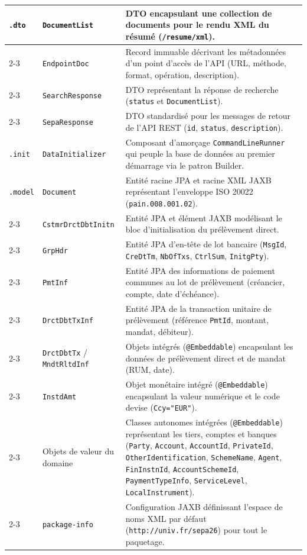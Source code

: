 \documentclass[12pt,a4paper]{article}
\begin{document}
\begin{longtable}{|p{3.8cm}|p{4.6cm}|p{6.8cm}|}
    \texttt{.dto} & \texttt{DocumentList} & DTO encapsulant une collection de documents pour le rendu XML du résumé (\texttt{/resume/xml}). \\
    \cline{2-3}
    & \texttt{EndpointDoc} & Record immuable décrivant les métadonnées d'un point d'accès de l'API (URL, méthode, format, opération, description). \\
    \cline{2-3}
    & \texttt{SearchResponse} & DTO représentant la réponse de recherche (\texttt{status} et \texttt{DocumentList}). \\
    \cline{2-3}
    & \texttt{SepaResponse} & DTO standardisé pour les messages de retour de l'API REST (\texttt{id}, \texttt{status}, \texttt{description}). \\
    \hline

    \texttt{.init} & \texttt{DataInitializer} & Composant d'amorçage \texttt{CommandLineRunner} qui peuple la base de données au premier démarrage via le patron Builder. \\
    \hline

    \texttt{.model} & \texttt{Document} & Entité racine JPA et racine XML JAXB représentant l'enveloppe ISO 20022 (\texttt{pain.008.001.02}). \\
    \cline{2-3}
    & \texttt{CstmrDrctDbtInitn} & Entité JPA et élément JAXB modélisant le bloc d'initialisation du prélèvement direct. \\
    \cline{2-3}
    & \texttt{GrpHdr} & Entité JPA d'en-tête de lot bancaire (\texttt{MsgId}, \texttt{CreDtTm}, \texttt{NbOfTxs}, \texttt{CtrlSum}, \texttt{InitgPty}). \\
    \cline{2-3}
    & \texttt{PmtInf} & Entité JPA des informations de paiement communes au lot de prélèvement (créancier, compte, date d'échéance). \\
    \cline{2-3}
    & \texttt{DrctDbtTxInf} & Entité JPA de la transaction unitaire de prélèvement (référence \texttt{PmtId}, montant, mandat, débiteur). \\
    \cline{2-3}
    & \texttt{DrctDbtTx} / \texttt{MndtRltdInf} & Objets intégrés (\texttt{@Embeddable}) encapsulant les données de prélèvement direct et de mandat (RUM, date). \\
    \cline{2-3}
    & \texttt{InstdAmt} & Objet monétaire intégré (\texttt{@Embeddable}) encapsulant la valeur numérique et le code devise (\texttt{Ccy="EUR"}). \\
    \cline{2-3}
    & Objets de valeur du domaine & Classes autonomes intégrées (\texttt{@Embeddable}) représentant les tiers, comptes et banques (\texttt{Party}, \texttt{Account}, \texttt{AccountId}, \texttt{PrivateId}, \texttt{OtherIdentification}, \texttt{SchemeName}, \texttt{Agent}, \texttt{FinInstnId}, \texttt{AccountSchemeId}, \texttt{PaymentTypeInfo}, \texttt{ServiceLevel}, \texttt{LocalInstrument}). \\
    \cline{2-3}
    & \texttt{package-info} & Configuration JAXB définissant l'espace de noms XML par défaut (\texttt{http://univ.fr/sepa26}) pour tout le paquetage. \\
    \hline


\end{longtable}
\end{document}
